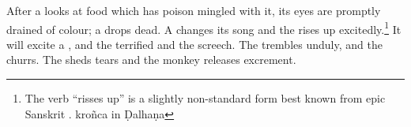 \begin{translation}

After a  looks at
food which has poison mingled with it, its eyes are promptly drained of colour; a
 drops dead.  A
 changes its song and the
 rises up 
excitedly.\footnote{The verb  “risses up” is a slightly non-standard form best 
known from epic Sanskrit \citep[see][212, \S 7.6.1]{ober-2003}. kroñca in Ḍalhaṇa}  It will 
excite a , and the 
terrified  and the  screech. The
 trembles unduly, and the  churrs. The
  sheds
tears and the monkey releases excrement.
 
    \end{translation}